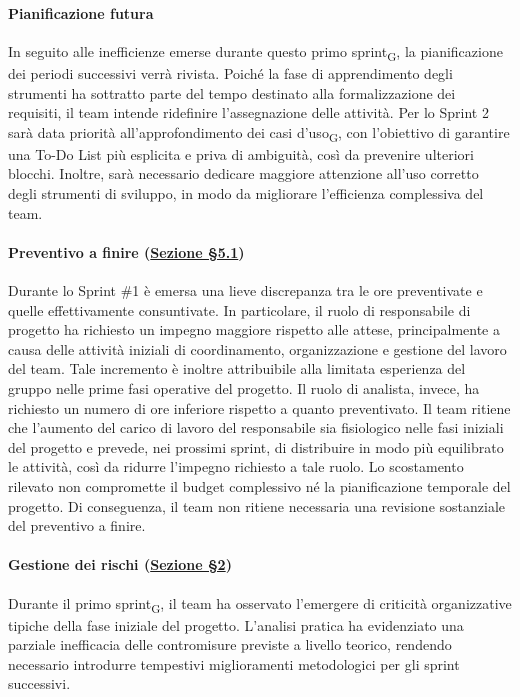 ﻿\documentclass[a4paper, 10pt, colorlinks=true, linkcolor=black, urlcolor=blue, citecolor=blue, hidelinks]{article}
\begin{document}
\paragraph{Pianificazione futura}
In seguito alle inefficienze emerse durante questo primo sprint\textsubscript{G}, la pianificazione dei periodi successivi verrà rivista. Poiché la fase di apprendimento degli strumenti ha sottratto parte del tempo destinato alla formalizzazione dei requisiti, il team intende ridefinire l’assegnazione delle attività.
Per lo Sprint 2 sarà data priorità all'approfondimento dei casi d’uso\textsubscript{G}, con l’obiettivo di garantire una To-Do List più esplicita e priva di ambiguità, così da prevenire ulteriori blocchi. Inoltre, sarà necessario dedicare maggiore attenzione all’uso corretto degli strumenti di sviluppo, in modo da migliorare l’efficienza complessiva del team.
\paragraph{Preventivo a finire (\hyperref[tab:preventivo-finire]{Sezione \S5.1})}

Durante lo Sprint \#1 è emersa una lieve discrepanza
tra le ore preventivate e quelle effettivamente consuntivate.
In particolare, il ruolo di responsabile di progetto
ha richiesto un impegno maggiore rispetto alle attese,
principalmente a causa delle attività iniziali di coordinamento,
organizzazione e gestione del lavoro del team.
Tale incremento è inoltre attribuibile alla limitata esperienza
del gruppo nelle prime fasi operative del progetto.
Il ruolo di analista, invece, ha richiesto un numero di ore
inferiore rispetto a quanto preventivato.
Il team ritiene che l'aumento del carico di lavoro del responsabile
sia fisiologico nelle fasi iniziali del progetto e prevede,
nei prossimi sprint, di distribuire in modo più equilibrato
le attività, così da ridurre
l'impegno richiesto a tale ruolo.
Lo scostamento rilevato non compromette il budget complessivo
né la pianificazione temporale del progetto.
Di conseguenza, il team non ritiene necessaria
una revisione sostanziale del preventivo a finire.

\paragraph{Gestione dei rischi (\hyperref[tab:gestione-rischi]{Sezione \S2})}
Durante il primo sprint\textsubscript{G}, il team ha osservato l’emergere di criticità organizzative tipiche della fase iniziale del progetto. L’analisi pratica ha evidenziato una parziale inefficacia delle contromisure previste a livello teorico, rendendo necessario introdurre tempestivi miglioramenti metodologici per gli sprint successivi.
\end{document}
